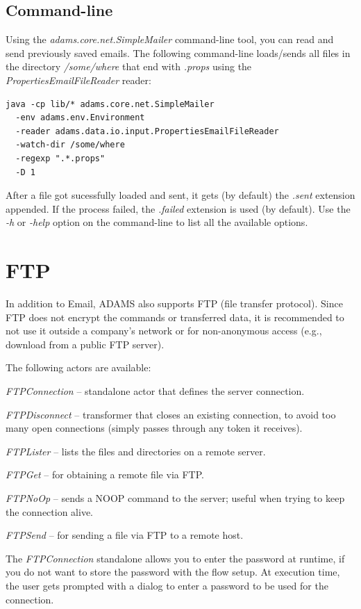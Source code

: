 \documentclass[a4paper]{book}
\begin{document}
\section{Command-line}
Using the \textit{adams.core.net.SimpleMailer} command-line tool, you can read
and send previously saved emails. The following command-line loads/sends all 
files in the directory \textit{/some/where} that end with \textit{.props} using the
\textit{PropertiesEmailFileReader} reader:
\begin{verbatim}
java -cp lib/* adams.core.net.SimpleMailer
  -env adams.env.Environment
  -reader adams.data.io.input.PropertiesEmailFileReader
  -watch-dir /some/where
  -regexp ".*.props"
  -D 1
\end{verbatim}
After a file got sucessfully loaded and sent, it gets (by default) the 
\textit{.sent} extension appended. If the process failed, the \textit{.failed}
extension is used (by default).
Use the \textit{-h} or \textit{-help} option on the command-line to list all 
the available options.

\chapter{FTP}
In addition to Email, ADAMS also supports FTP (file transfer protocol). Since
FTP does not encrypt the commands or transferred data, it is recommended to not
use it outside a company's network or for non-anonymous access (e.g., download
from a public FTP server).

The following actors are available:
\begin{tight_itemize}
	\item \textit{FTPConnection} -- standalone actor that defines the server
	connection.
	\item \textit{FTPDisconnect} -- transformer that closes an existing 
	connection, to avoid too many open connections (simply passes through any 
	token it receives).
	\item \textit{FTPLister} -- lists the files and directories on a remote
	server.
	\item \textit{FTPGet} -- for obtaining a remote file via FTP.
	\item \textit{FTPNoOp} -- sends a NOOP command to the server; useful when
	trying to keep the connection alive.
	\item \textit{FTPSend} -- for sending a file via FTP to a remote host.
\end{tight_itemize}
The \textit{FTPConnection} standalone allows you to enter the password at 
runtime, if you do not want to store the password with the
flow setup. At execution time, the user gets prompted with a dialog to enter
a password to be used for the connection.
\end{document}
